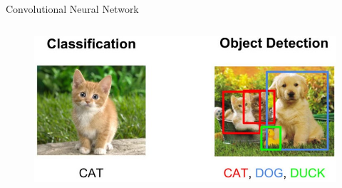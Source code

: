 \begin{frame}{Convolutional Neural Network}
{\begin{columns}[T]
            \begin{figure}
                \centering
                \includegraphics[width=\textwidth]{Bilder/classification_detection.jpeg}
            \end{figure}
        \end{columns}
    }
\end{frame}




%         



        
